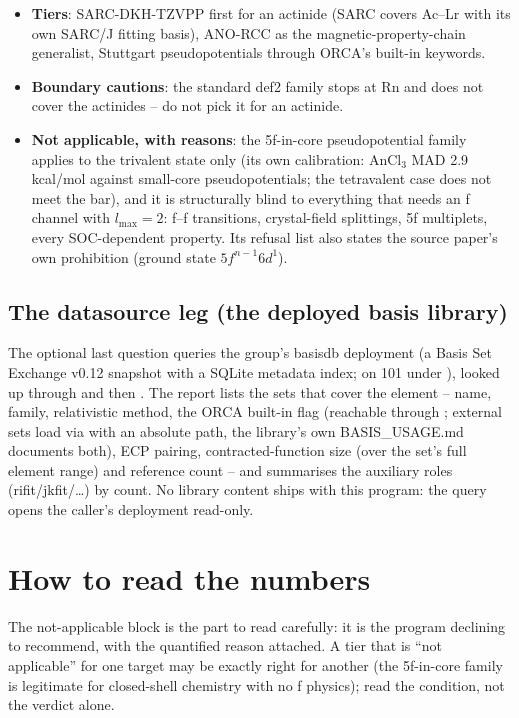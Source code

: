 \begin{itemize}
  \item \textbf{Tiers}: SARC-DKH-TZVPP first for an actinide (SARC covers
    Ac--Lr with its own SARC/J fitting basis), ANO-RCC as the
    magnetic-property-chain generalist, Stuttgart pseudopotentials through
    ORCA's built-in keywords.
  \item \textbf{Boundary cautions}: the standard def2 family stops at Rn and
    does not cover the actinides -- do not pick it for an actinide.
  \item \textbf{Not applicable, with reasons}: the 5f-in-core pseudopotential
    family applies to the trivalent state only (its own calibration: AnCl$_3$
    MAD 2.9 kcal/mol against small-core pseudopotentials; the tetravalent case
    does not meet the bar), and it is structurally blind to everything that
    needs an f channel with $l_{\max} = 2$: f--f transitions, crystal-field
    splittings, 5f multiplets, every SOC-dependent property. Its refusal list
    also states the source paper's own prohibition (ground state
    $5f^{n-1}6d^1$).
\end{itemize}

\subsection*{The datasource leg (the deployed basis library)}

The optional last question queries the group's basisdb deployment (a Basis
Set Exchange v0.12 snapshot with a SQLite metadata index; on 101 under
), looked up through 
and then .  The report lists the sets
that cover the element -- name, family, relativistic method, the ORCA
built-in flag (reachable through ; external sets load via
 with an absolute path, the library's own BASIS\_USAGE.md
documents both), ECP pairing, contracted-function size (over the set's full
element range) and reference count -- and summarises the auxiliary roles
(rifit/jkfit/\dots) by count.  No library content ships with this program:
the query opens the caller's deployment read-only.

\section{How to read the numbers}

\begin{readbox}
The not-applicable block is the part to read carefully: it is the program
declining to recommend, with the quantified reason attached. A tier that is
``not applicable'' for one target may be exactly right for another (the
5f-in-core family is legitimate for closed-shell chemistry with no f physics);
read the condition, not the verdict alone.
\end{readbox}

